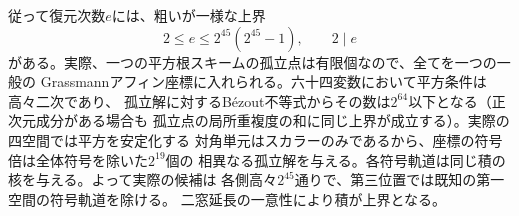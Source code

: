 従って復元次数$e$には、粗いが一様な上界
\[
 2\le e\le 2^{45}(2^{45}-1),\qquad 2\mid e
\]
がある。実際、一つの平方根スキームの孤立点は有限個なので、全てを一つの一般の
Grassmannアフィン座標に入れられる。六十四変数において平方条件は高々二次であり、
孤立解に対するBézout不等式からその数は$2^{64}$以下となる（正次元成分がある場合も
孤立点の局所重複度の和に同じ上界が成立する）。実際の四空間では平方を安定化する
対角単元はスカラーのみであるから、座標の符号倍は全体符号を除いた$2^{19}$個の
相異なる孤立解を与える。各符号軌道は同じ積の核を与える。よって実際の候補は
各側高々$2^{45}$通りで、第三位置では既知の第一空間の符号軌道を除ける。
二窓延長の一意性により積が上界となる。

